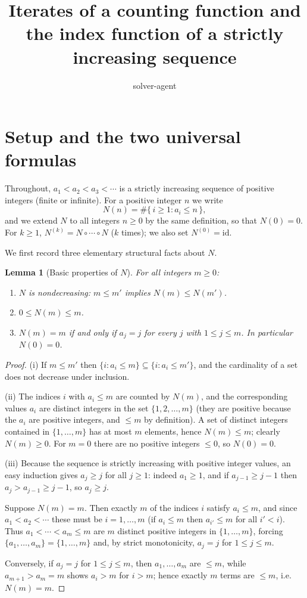 \documentclass[12pt]{article}
\title{Iterates of a counting function and the index function of a strictly increasing sequence}
\author{solver-agent}
\date{}
\newtheorem{lemma}{Lemma}
\theoremstyle{definition}
\begin{document}
\maketitle

\section{Setup and the two universal formulas}

Throughout, $a_1<a_2<a_3<\cdots$ is a strictly increasing sequence of positive
integers (finite or infinite). For a positive integer $n$ we write
\[
  N(n)=\#\{\,i\ge 1: a_i\le n\,\},
\]
and we extend $N$ to all integers $n\ge 0$ by the same definition, so that
$N(0)=0$. For $k\ge 1$, $N^{(k)}=N\circ\cdots\circ N$ ($k$ times); we also set
$N^{(0)}=\mathrm{id}$.

We first record three elementary structural facts about $N$.

\begin{lemma}[Basic properties of $N$]\label{lem:basic}
For all integers $m\ge 0$:
\begin{enumerate}
\item[(i)] $N$ is nondecreasing: $m\le m'$ implies $N(m)\le N(m')$.
\item[(ii)] $0\le N(m)\le m$.
\item[(iii)] $N(m)=m$ if and only if $a_j=j$ for every $j$ with $1\le j\le m$.
In particular $N(0)=0$.
\end{enumerate}
\end{lemma}

\begin{proof}
(i) If $m\le m'$ then $\{i:a_i\le m\}\subseteq\{i:a_i\le m'\}$, and the cardinality
of a set does not decrease under inclusion.

(ii) The indices $i$ with $a_i\le m$ are counted by $N(m)$, and the corresponding
values $a_i$ are distinct integers in the set $\{1,2,\dots,m\}$ (they are positive
because the $a_i$ are positive integers, and $\le m$ by definition). A set of
distinct integers contained in $\{1,\dots,m\}$ has at most $m$ elements, hence
$N(m)\le m$; clearly $N(m)\ge 0$. For $m=0$ there are no positive integers $\le 0$,
so $N(0)=0$.

(iii) Because the sequence is strictly increasing with positive integer values, an
easy induction gives $a_j\ge j$ for all $j\ge 1$: indeed $a_1\ge 1$, and if
$a_{j-1}\ge j-1$ then $a_j>a_{j-1}\ge j-1$, so $a_j\ge j$.

Suppose $N(m)=m$. Then exactly $m$ of the indices $i$ satisfy $a_i\le m$, and since
$a_1<a_2<\cdots$ these must be $i=1,\dots,m$ (if $a_i\le m$ then $a_{i'}\le m$ for all
$i'<i$). Thus $a_1<\cdots<a_m\le m$ are $m$ distinct positive integers in
$\{1,\dots,m\}$, forcing $\{a_1,\dots,a_m\}=\{1,\dots,m\}$ and, by strict
monotonicity, $a_j=j$ for $1\le j\le m$.

Conversely, if $a_j=j$ for $1\le j\le m$, then $a_1,\dots,a_m$ are $\le m$, while
$a_{m+1}>a_m=m$ shows $a_i>m$ for $i>m$; hence exactly $m$ terms are $\le m$, i.e.
$N(m)=m$.
\end{proof}
\end{document}
